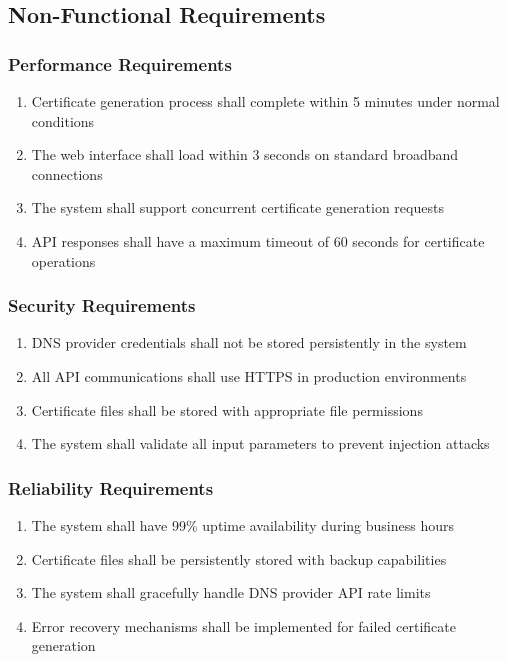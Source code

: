 \subsection{Non-Functional Requirements}

\subsubsection{Performance Requirements}
\begin{enumerate}
    \item Certificate generation process shall complete within 5 minutes under normal conditions
    \item The web interface shall load within 3 seconds on standard broadband connections
    \item The system shall support concurrent certificate generation requests
    \item API responses shall have a maximum timeout of 60 seconds for certificate operations
\end{enumerate}

\subsubsection{Security Requirements}
\begin{enumerate}
    \item DNS provider credentials shall not be stored persistently in the system
    \item All API communications shall use HTTPS in production environments
    \item Certificate files shall be stored with appropriate file permissions
    \item The system shall validate all input parameters to prevent injection attacks
\end{enumerate}

\subsubsection{Reliability Requirements}
\begin{enumerate}
    \item The system shall have 99\% uptime availability during business hours
    \item Certificate files shall be persistently stored with backup capabilities
    \item The system shall gracefully handle DNS provider API rate limits
    \item Error recovery mechanisms shall be implemented for failed certificate generation
\end{enumerate}

